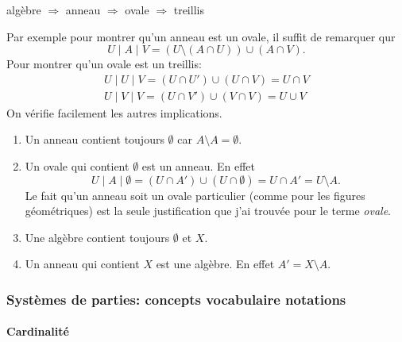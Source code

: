 \begin{prop}
  algèbre $\Rightarrow$ anneau $\Rightarrow$ ovale $\Rightarrow$ treillis
\end{prop}
\begin{demo}
Par exemple pour montrer qu'un anneau est un ovale, il suffit de remarquer qur 
\begin{displaymath}
  U \mid A \mid V = (U \setminus (A \cap U)) \cup (A \cap V).
\end{displaymath}
Pour montrer qu'un ovale est un treillis:
\begin{align*}
  U \mid U \mid V = (U \cap U') \cup (U \cap V) = U \cap V \\
  U \mid V \mid V = (U \cap V') \cup (V \cap V) = U \cup V
\end{align*}
On vérifie facilement les autres implications.
\end{demo}

\begin{rems}
 \begin{enumerate}
  \item Un anneau contient toujours $\emptyset$ car $A \setminus A = \emptyset$.
  \item Un ovale qui contient $\emptyset$ est un anneau. En effet
    \begin{displaymath}
      U \mid A \mid \emptyset = (U \cap A')\cup (U \cap \emptyset) = U \cap A' = U \setminus A.
    \end{displaymath}
    Le fait qu'un anneau soit un ovale particulier (comme pour les figures géométriques) est la seule justification que j'ai trouvée pour le terme \emph{ovale}.
  \item Une algèbre contient toujours $\emptyset$ et $X$.
  \item Un anneau qui contient $X$ est une algèbre. En effet $A' = X \setminus A$.
 \end{enumerate}
\end{rems}

\subsubsection{Systèmes de parties: concepts vocabulaire notations}\label{types cardinalité}
\paragraph{Cardinalité}

